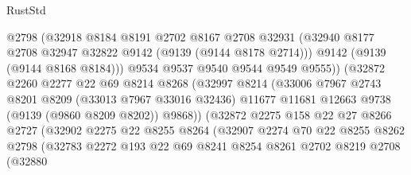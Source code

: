 \begin{lexlean}{RustStd}
\begin{coremodule}
                            @2798
                            (@32918
                              @8184
                              @8191
                              @2702
                              @8167
                              @2708
                              @32931
                              (@32940 @8177 @2708 @32947 @32822 @9142 (@9139 (@9144 @8178 @2714)))
                              @9142
                              (@9139 (@9144 @8168 @8184)))
                            @9534
                            @9537
                            @9540
                            @9544
                            @9549
                            @9555))
                        (@32872
                          @2260
                          @2277
                          @22
                          @69
                          @8214
                          @8268
                          (@32997
                            @8214
                            (@33006
                              @7967
                              @2743
                              @8201
                              @8209
                              (@33013 @7967 @33016 @32436)
                              @11677
                              @11681
                              @12663
                              @9738
                              (@9139 (@9860 @8209 @8202))
                              @9868))
                          (@32872
                            @2275
                            @158
                            @22
                            @27
                            @8266
                            @2727
                            (@32902
                              @2275
                              @22
                              @8255
                              @8264
                              (@32907
                                @2274
                                @70
                                @22
                                @8255
                                @8262
                                @2798
                                (@32783
                                  @2272
                                  @193
                                  @22
                                  @69
                                  @8241
                                  @8254
                                  @8261
                                  @2702
                                  @8219
                                  @2708
                                  (@32880

\end{coremodule}
\end{lexlean}
